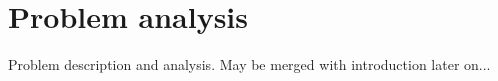 \chapter{Problem analysis}

Problem description and analysis. May be merged with introduction later on...

\nlipsum

\begin{comment}
Biomolecular simulations are becoming increasingly important for drug development. In these simulations, force field models are required to describe the interatomic relations of the drug molecules. In order to run a simulation, these force fields require a certain topology, which should include the atom types, bonds, angles, atomic charges and charge group assignments.

\begin{figure}[h!]
\begin{center}
\texttt{[image: img/partial\_charges.pdf]}
\caption{Schematic view of nitroethane ($C_{2}H_{5}NO_{2}$), including topology data on atom types, atomic charges and charge groups.}
\figlab{partial_charges}
\end{center}
\end{figure}

\Figref{partial_charges} shows the schematic view of a nitroethane molecule. Here, every oval symbolises an atom. The atom type is the letter on the top rule of the oval, i.e. \verb|H| is the atom type of the sphere \verb|H5 (6)|. The first number indicates the index in the list of atoms of that type (\verb|5| in the example), the second the overall atom index in the molecule (\verb|6| in the example). The bonds between atoms are shown as lines between the ovals and the atomic charges are given by the number at the bottom row of the oval (\verb|0.071| for \verb|H5 (6)|). Finally, the colouring of the atoms and the boxes around them denote a molecular charge group. This is a group of connected atoms, for which the total charge is ideally equal to that of the whole molecule.

In a recent study, El-Kebir, Klau et al. have developed an algorithm that allows for fast and reasonable assignment of charge groups~\cite{canzar2012charge}. As this is now optimised, they currently focus on a different step in the parameterisation: that of calculating the atomic partial charges. Currently, these charges are retrieved using some complex quantum-mechanical calculations. However, as molecules grow bigger, these calculations can take hours or even days to complete. As it is not believed that these calculations can be speeded up, a different approach is needed for finding the partial atomic charges.


\end{comment}
